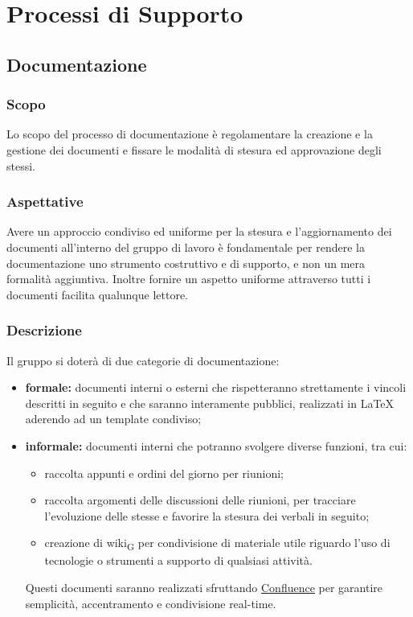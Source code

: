 \section{Processi di Supporto}
\label{supporto}
\subsection{Documentazione}
    \subsubsection{Scopo}
        Lo scopo del processo di documentazione è regolamentare la creazione e la gestione dei documenti e fissare le modalità di stesura ed approvazione degli stessi.
    \subsubsection{Aspettative}
        Avere un approccio condiviso ed uniforme per la stesura e l'aggiornamento dei documenti all'interno del gruppo di lavoro è fondamentale per rendere la documentazione uno strumento costruttivo e di supporto, e non un mera formalità aggiuntiva.
        Inoltre fornire un aspetto uniforme attraverso tutti i documenti facilita qualunque lettore.
    \subsubsection{Descrizione}
        Il gruppo \group si doterà di due categorie di documentazione:
        \begin{itemize}
            \item \textbf{formale: }documenti interni o esterni che rispetteranno strettamente i vincoli descritti in seguito e che saranno interamente pubblici, realizzati in \LaTeX{} aderendo ad un template condiviso;
            \item \textbf{informale: }documenti interni che potranno svolgere diverse funzioni, tra cui:
            \begin{itemize}
                \item  raccolta appunti e ordini del giorno per riunioni;
                \item  raccolta argomenti delle discussioni delle riunioni, per tracciare l'evoluzione delle stesse e favorire la stesura dei verbali in seguito;
                \item  creazione di \gls{wiki}\textsubscript{G} per condivisione di materiale utile riguardo l'uso di tecnologie o strumenti a supporto di qualsiasi attività.
            \end{itemize}
            Questi documenti saranno realizzati sfruttando \href{https://www.atlassian.com/software/confluence}{Confluence} per garantire semplicità, accentramento e condivisione real-time.

        \end{itemize}
